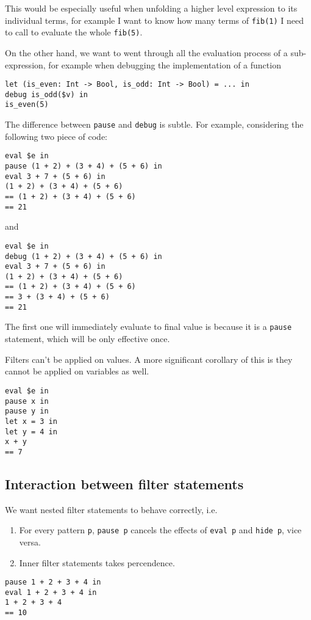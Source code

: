 This would be especially useful when unfolding a higher level
expression to its individual terms, for example I want to know how
many terms of \verb|fib(1)| I need to call to evaluate the whole
\verb|fib(5)|.

On the other hand, we want to went through all the evaluation process of a
sub-expression, for example when debugging the implementation of a function
\begin{verbatim}
let (is_even: Int -> Bool, is_odd: Int -> Bool) = ... in
debug is_odd($v) in
is_even(5)
\end{verbatim}

The difference between \verb|pause| and \verb|debug| is subtle. For
example, considering the following two piece of code:
\begin{verbatim}
eval $e in
pause (1 + 2) + (3 + 4) + (5 + 6) in
eval 3 + 7 + (5 + 6) in
(1 + 2) + (3 + 4) + (5 + 6)
== (1 + 2) + (3 + 4) + (5 + 6)
== 21
\end{verbatim}
and
\begin{verbatim}
eval $e in
debug (1 + 2) + (3 + 4) + (5 + 6) in
eval 3 + 7 + (5 + 6) in
(1 + 2) + (3 + 4) + (5 + 6)
== (1 + 2) + (3 + 4) + (5 + 6)
== 3 + (3 + 4) + (5 + 6)
== 21
\end{verbatim}
The first one will immediately evaluate to final value is because it is a \verb|pause| statement, which will be only effective once.

Filters can't be applied on values. A more significant corollary of this is they cannot be applied on variables as well.
\begin{verbatim}
eval $e in
pause x in
pause y in
let x = 3 in
let y = 4 in
x + y
== 7
\end{verbatim}

\subsection{Interaction between filter statements}

We want nested filter statements to behave correctly, i.e.
\begin{enumerate}
\item For every pattern \verb|p|, \verb|pause p| cancels the effects
  of \verb|eval p| and \verb|hide p|, vice versa.
\item Inner filter statements takes percendence.
\end{enumerate}

\begin{verbatim}
pause 1 + 2 + 3 + 4 in
eval 1 + 2 + 3 + 4 in
1 + 2 + 3 + 4
== 10
\end{verbatim}

